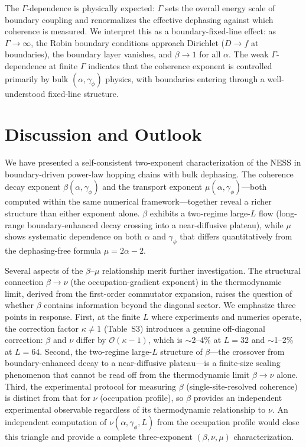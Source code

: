 \documentclass[aps,prb,twocolumn,superscriptaddress,floatfix]{revtex4-2}
\begin{document}
The $\Gamma$-dependence is physically expected: $\Gamma$ sets the overall energy scale of boundary coupling and renormalizes the effective dephasing against which coherence is measured. We interpret this as a boundary-fixed-line effect: as $\Gamma \to \infty$, the Robin boundary conditions approach Dirichlet ($D \to f$ at boundaries), the boundary layer vanishes, and $\beta \to 1$ for all $\alpha$. The weak $\Gamma$-dependence at finite $\Gamma$ indicates that the coherence exponent is controlled primarily by bulk $(\alpha, \gamma_\phi)$ physics, with boundaries entering through a well-understood fixed-line structure.

\section{Discussion and Outlook}
\label{sec:discussion}

We have presented a self-consistent two-exponent characterization of the NESS in boundary-driven power-law hopping chains with bulk dephasing. The coherence decay exponent $\beta(\alpha,\gamma_\phi)$ and the transport exponent $\mu(\alpha,\gamma_\phi)$---both computed within the same numerical framework---together reveal a richer structure than either exponent alone. $\beta$ exhibits a two-regime large-$L$ flow (long-range boundary-enhanced decay crossing into a near-diffusive plateau), while $\mu$ shows systematic dependence on both $\alpha$ and $\gamma_\phi$ that differs quantitatively from the dephasing-free formula $\mu = 2\alpha - 2$.

Several aspects of the $\beta$--$\mu$ relationship merit further investigation. The structural connection $\beta \to \nu$ (the occupation-gradient exponent) in the thermodynamic limit, derived from the first-order commutator expansion, raises the question of whether $\beta$ contains information beyond the diagonal sector. We emphasize three points in response. First, at the finite $L$ where experiments and numerics operate, the correction factor $\kappa \neq 1$ (Table~S3) introduces a genuine off-diagonal correction: $\beta$ and $\nu$ differ by $\mathcal{O}(\kappa-1)$, which is $\sim$2--4\% at $L=32$ and $\sim$1--2\% at $L=64$. Second, the two-regime large-$L$ structure of $\beta$---the crossover from boundary-enhanced decay to a near-diffusive plateau---is a finite-size scaling phenomenon that cannot be read off from the thermodynamic limit $\beta \to \nu$ alone. Third, the experimental protocol for measuring $\beta$ (single-site-resolved coherence) is distinct from that for $\nu$ (occupation profile), so $\beta$ provides an independent experimental observable regardless of its thermodynamic relationship to $\nu$. An independent computation of $\nu(\alpha,\gamma_\phi,L)$ from the occupation profile would close this triangle and provide a complete three-exponent $(\beta, \nu, \mu)$ characterization.
\end{document}

